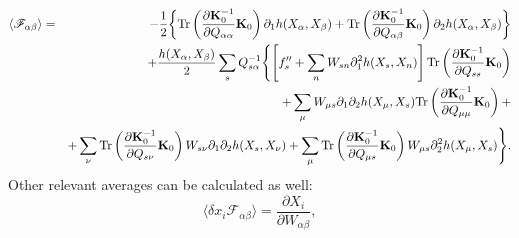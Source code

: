 \begin{eqnarray}
   \langle\mathscr{F}_{\alpha\beta}\rangle  &=&-\frac{1}{2}\biggl\{ \text{Tr}\left( \frac{\partial {\bf K}_0^{-1}}{\partial Q_{\alpha \alpha}}{\bf K}_0\right) \partial_1 h(X_\alpha, X_\beta)+ \text{Tr}\left(\frac{\partial {\bf K}_0^{-1}}{\partial Q_{\alpha \beta}}{\bf K}_0\right)\partial_2h(X_\alpha, X_\beta)\biggr\} \nonumber\\
    & &+\frac{h(X_\alpha, X_\beta)}{2}\sum_s Q_{s\alpha}^{-1}  \Biggl\{
 \left[f_s''+\sum_n W_{sn}\partial_1^2h(X_s,X_n)\right] \text{Tr}\left(  \frac{\partial {\bf K}_0^{-1}}{\partial Q_{ss}}  {\bf K}_0\right) \label{avescrFab}\\
& &+ \sum_\mu W_{\mu s}\partial_1\partial_2h(X_\mu,X_s)\text{Tr}\left(  \frac{\partial {\bf K}_0^{-1}}{\partial Q_{\mu\mu}}  {\bf K}_0\right)+ \nonumber \\
 & &+ \sum_\nu  \text{Tr}\left(  \frac{\partial {\bf K}_0^{-1}}{\partial Q_{s\nu}}  {\bf K}_0\right) W_{s\nu}\partial_1\partial_2h(X_s,X_\nu) + \sum_\mu  \text{Tr}\left(  \frac{\partial {\bf K}_0^{-1}}{\partial Q_{\mu s}}  {\bf K}_0\right) W_{\mu s}\partial^2_2h(X_\mu,X_s)  
   \Biggr\}\nonumber .
\end{eqnarray}
Other relevant averages can be calculated as well:
\begin{equation}
\langle \delta x_i {\mathscr F}_{\alpha\beta}\rangle= \frac{\partial X_i}{\partial W_{\alpha\beta}} \label{dxscrFab},
\end{equation} 
